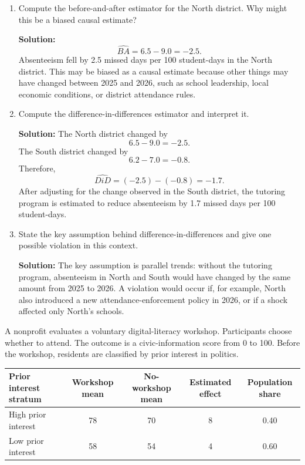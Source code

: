 \documentclass[11pt]{exam}
\begin{document}
\begin{questions}
\begin{enumerate}[leftmargin = 0.5cm, label = (\alph*), rightmargin = 0.2cm]
    \item Compute the before-and-after estimator for the North district. Why might this be a biased causal estimate?

    \begin{solutionorbox}[6.3cm]
    \textbf{Solution:}
    \[
    \widehat{BA}=6.5-9.0=-2.5.
    \]
    Absenteeism fell by 2.5 missed days per 100 student-days in the North district. This may be biased as a causal estimate because other things may have changed between 2025 and 2026, such as school leadership, local economic conditions, or district attendance rules.
    \end{solutionorbox}

    \item Compute the difference-in-differences estimator and interpret it.

    \begin{solutionorbox}[6.8cm]
    \textbf{Solution:} The North district changed by
    \[
    6.5-9.0=-2.5.
    \]
    The South district changed by
    \[
    6.2-7.0=-0.8.
    \]
    Therefore,
    \[
    \widehat{DiD}=(-2.5)-(-0.8)=-1.7.
    \]
    After adjusting for the change observed in the South district, the tutoring program is estimated to reduce absenteeism by 1.7 missed days per 100 student-days.
    \end{solutionorbox}

    \item State the key assumption behind difference-in-differences and give one possible violation in this context.

    \begin{solutionorbox}[6.5cm]
    \textbf{Solution:} The key assumption is parallel trends: without the tutoring program, absenteeism in North and South would have changed by the same amount from 2025 to 2026. A violation would occur if, for example, North also introduced a new attendance-enforcement policy in 2026, or if a shock affected only North's schools.
    \end{solutionorbox}
\end{enumerate}

\newpage
\question[2.5]
A nonprofit evaluates a voluntary digital-literacy workshop. Participants choose whether to attend. The outcome is a civic-information score from 0 to 100. Before the workshop, residents are classified by prior interest in politics.

\begin{center}
\begin{tabular}{lcccc}
\toprule
Prior interest stratum & Workshop mean & No-workshop mean & Estimated effect & Population share \\
\midrule
High prior interest & 78 & 70 & 8 & 0.40 \\
Low prior interest  & 58 & 54 & 4 & 0.60 \\
\bottomrule
\end{tabular}
\end{center}


\end{questions}
\end{document}
